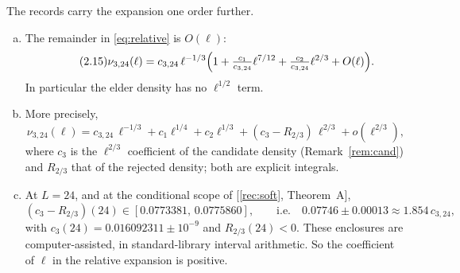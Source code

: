 \begin{remark}\label{rem:beyond}
The records  carry the expansion one order further.
\begin{enumerate}[(a)]
\item The remainder in \eqref{eq:relative} is $O(\ell)$:
\begin{equation}\tag{2.15}
\nu_{3,24}(\ell)=c_{3,24}\,\ell^{-1/3}\Bigl(1+\tfrac{c_1}{c_{3,24}}\ell^{7/12}+\tfrac{c_2}{c_{3,24}}\ell^{2/3}+O(\ell)\Bigr).
\end{equation}
In particular the elder density has no $\ell^{1/2}$ term.
\item More precisely,
\begin{equation}\tag{2.16}\label{eq:next}
\nu_{3,24}(\ell)=c_{3,24}\,\ell^{-1/3}+c_1\ell^{1/4}+c_2\ell^{1/3}+(c_3-R_{2/3})\,\ell^{2/3}+o(\ell^{2/3}),
\end{equation}
where $c_3$ is the $\ell^{2/3}$ coefficient of the candidate density (Remark~\ref{rem:cand}) and $R_{2/3}$ that of the rejected density; both are explicit integrals.
\item At $L=24$, and at the conditional scope of [\ref{rec:soft}, Theorem~A],
\[
(c_3-R_{2/3})(24)\in[0.0773381,\,0.0775860],\qquad\text{i.e.}\quad 0.07746\pm0.00013\approx1.854\,c_{3,24},
\]
with $c_3(24)=0.016092311\pm10^{-9}$ and $R_{2/3}(24)<0$. These enclosures are computer-assisted, in standard-library interval arithmetic. So the coefficient of $\ell$ in the relative expansion is positive.
\end{enumerate}
\end{remark}


